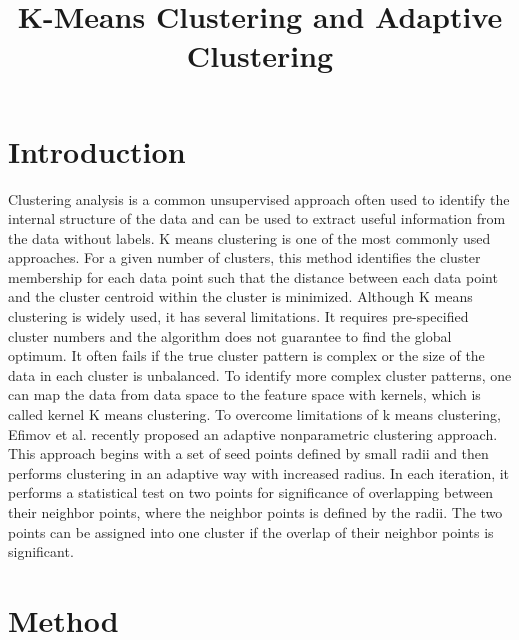 \documentclass[aoas,preprint]{imsart}
\numberwithin{equation}{section}
\theoremstyle{plain}
\begin{document}
\begin{frontmatter}
\title{K-Means Clustering and Adaptive Clustering}

\begin{aug}
\author{ }





\end{aug}


\end{frontmatter}

\section{Introduction}
Clustering analysis is a common unsupervised approach often used to identify the internal structure of the data and can be used to extract useful information from the data without labels. K means clustering is one of the most commonly used approaches. For a given number of clusters, this method identifies the cluster membership for each data point such that the distance between each data point and the cluster centroid within the cluster is minimized. Although K means clustering is widely used, it has several limitations. It requires pre-specified cluster numbers and the algorithm does not guarantee to find the global optimum.  It often fails if the true cluster pattern is complex or the size of the data in each cluster is unbalanced. To identify more complex cluster patterns, one can map the data from data space to the feature space with kernels, which is called kernel K means clustering. To overcome limitations of k means clustering, Efimov et al. recently proposed an adaptive nonparametric clustering approach. This approach begins with a set of seed points defined by small radii and then performs clustering in an adaptive way with increased radius. In each iteration, it performs a statistical test on two points for significance of overlapping between their neighbor points, where the neighbor points is defined by the radii.  The two points can be assigned into one cluster if the overlap of their neighbor points is significant.  



\section{Method}
\end{document}
